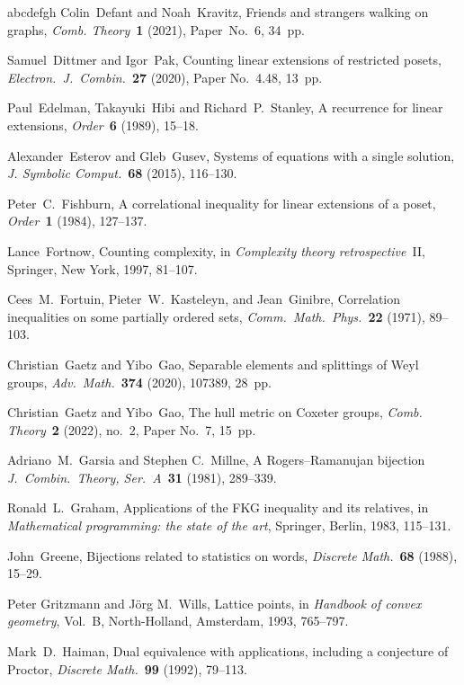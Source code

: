 \documentclass[11pt]{amsart}
\theoremstyle{definition}
\numberwithin{figure}{section}
\numberwithin{equation}{section}
\begin{document}
\begin{thebibliography}{abcdefgh}
Colin~Defant and Noah~Kravitz, Friends and strangers walking on graphs,
\emph{Comb. Theory}~\textbf{1} (2021), Paper~No.~6, 34~pp.

Samuel~Dittmer and Igor~Pak,
Counting linear extensions of restricted posets,
\emph{Electron.\ J.\ Combin.}~\textbf{27} (2020), Paper No.~4.48, 13~pp.

Paul~Edelman, Takayuki~Hibi and  Richard~P.~Stanley,
A recurrence for linear extensions, \emph{Order}~\textbf{6} (1989), 15--18.

Alexander~Esterov and Gleb~Gusev,
Systems of equations with a single solution,
\emph{J. Symbolic Comput.}~\textbf{68} (2015), 116--130.


Peter~C.~Fishburn,
A correlational inequality for linear extensions of a poset,
\emph{Order}~\textbf{1} (1984), 127--137.

Lance~Fortnow,
Counting complexity, in \emph{Complexity theory retrospective}~II,
Springer, New York, 1997, 81--107.

Cees~M.~Fortuin, Pieter~W.~Kasteleyn, and Jean~Ginibre,
Correlation inequalities on some partially ordered sets,
\emph{Comm.\ Math.\ Phys.}~\textbf{22} (1971), 89--103.


Christian~Gaetz and Yibo~Gao,
Separable elements and splittings of Weyl groups,
\emph{Adv.\ Math.}~\textbf{374} (2020), 107389, 28~pp.


Christian~Gaetz and Yibo~Gao,
The hull metric on Coxeter groups,
 \emph{Comb. Theory}~\textbf{2} (2022), no.~2, Paper No.~7, 15~pp.

Adriano~M.~Garsia and Stephen C.~Millne,
A Rogers--Ramanujan bijection
\emph{J.\ Combin.\ Theory, Ser.~A}~\textbf{31} (1981), 289--339.

Ronald~L.~Graham,
Applications of the FKG inequality and its relatives, in
\emph{Mathematical programming: the state of the art},
Springer, Berlin, 1983, 115--131.

John~Greene, Bijections related to statistics on words,
\emph{Discrete Math.}~\textbf{68} (1988), 15--29.

Peter Gritzmann and J\"org M.~Wills, Lattice points,
in \emph{Handbook of convex geometry}, Vol.~B,
North-Holland, Amsterdam, 1993, 765--797.

Mark~D.~Haiman,
Dual equivalence with applications, including a conjecture of Proctor,
\emph{Discrete Math.}~\textbf{99} (1992), 79--113.


\end{thebibliography}
\end{document}
